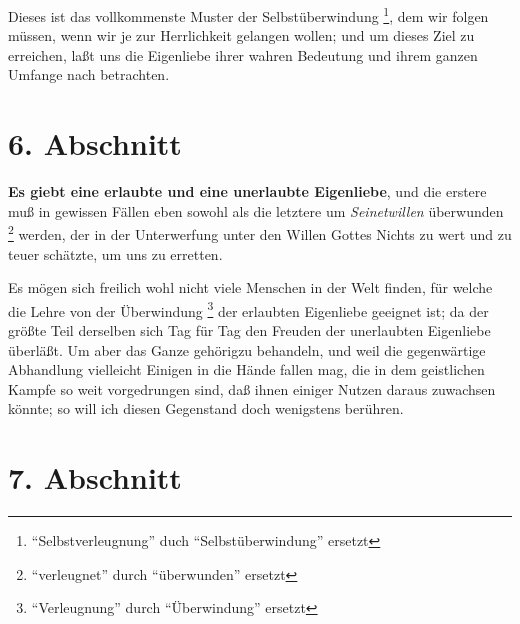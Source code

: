 Dieses ist das vollkommenste Muster der Selbstüberwindung \footnote{"`Selbstverleugnung"' duch "`Selbstüberwindung"' ersetzt}, dem wir folgen
müssen, wenn wir je zur Herrlichkeit gelangen wollen; und um dieses Ziel zu
erreichen, laßt uns die Eigenliebe ihrer wahren Bedeutung und ihrem ganzen
Umfange nach betrachten.

\section{6. Abschnitt} \label{kap4_ab6}

\textbf{Es giebt eine erlaubte und eine unerlaubte Eigenliebe}, und die erstere muß in
gewissen Fällen eben sowohl als die letztere um \textit{Seinetwillen} überwunden \footnote{"`verleugnet"' durch "`überwunden"' ersetzt}
werden, der in der Unterwerfung unter den Willen Gottes Nichts zu wert und zu
teuer schätzte, um uns zu erretten.

Es mögen sich freilich wohl nicht viele Menschen in der Welt finden, für welche
die Lehre von der Überwindung \footnote{"`Verleugnung"' durch "`Überwindung"' ersetzt} der erlaubten Eigenliebe geeignet ist; da der
größte Teil derselben sich Tag für Tag den Freuden der unerlaubten
Eigenliebe überläßt. Um aber das Ganze gehörigzu behandeln, und weil die
gegenwärtige Abhandlung vielleicht Einigen in die Hände fallen mag, die in dem
geistlichen Kampfe so weit vorgedrungen sind, daß ihnen einiger Nutzen daraus
zuwachsen könnte; so will ich diesen Gegenstand doch wenigstens berühren.

\section{7. Abschnitt} \label{kap4_ab7}

